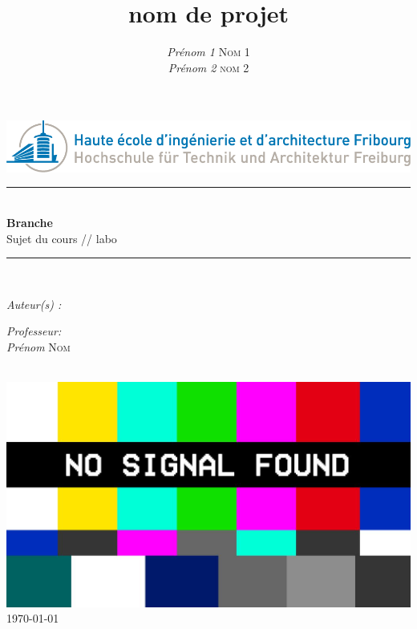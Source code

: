 

\title{nom de projet} 
\author{\textsl{Prénom 1} \textsc{Nom 1}\\
\textsl{Prénom 2} \textsc{nom 2}}
\date{}


    \begin{titlepage}
        \begin{center}
            \includegraphics[scale=.4]{Img/heia-fr-logo.png}\\[1.3cm]
            
            \rule{\linewidth}{0.3mm} \\[0.3cm]
            {\huge \bfseries Branche\\[0.5cm]} 
            {\Large  Sujet du cours // labo }
            \rule{\linewidth}{0.3mm} \\[0.8cm]
            \noindent
            \begin{minipage}[t]{0.4\textwidth}
                \begin{flushleft} \large
                    \emph{Auteur(s) :}\\
                    \theauthor
                \end{flushleft}
            \end{minipage}
            \begin{minipage}[t]{0.4\textwidth} 
                \begin{flushright} \large
                    \emph{Professeur:}\\
                    \textsl{Prénom} \textsc{Nom}\\ 
                \end{flushright} 
                \vfill
            \end{minipage}\\[1.3cm]
            \includegraphics[scale=0.6]{Img/1.JPG}\\[1.5cm]
            \vspace*{1\baselineskip}
            \today \\[0.7cm]
        \end{center}
    \end{titlepage}
